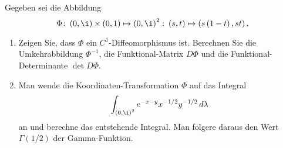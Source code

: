     \begin{prob}[Transformieren]
%
Gegeben sei die Abbildung
$$
\Phi \colon \left( 0 , \i \right) \times \left( 0 , 1 \right) \mapsto \left( 0 , \i \right)^2 \colon \left( s , t \right) \mapsto \left( s \left( 1 - t \right) , s t \right).
$$
\begin{enumerate}[label = (\alph*)]
	\item Zeigen Sie, dass $\Phi$ ein $C^1$-Diffeomorphismus ist. Berechnen Sie die Umkehrabbildung $\Phi^{-1}$, die Funktional-Matrix $D \Phi$ und die Funktional-Determinante $\det D \Phi$.
	\item Man wende die Koordinaten-Transformation $\Phi$ auf das Integral
	$$
	\int_{ \left( 0 , \i \right)^2 } e^{- x - y} x^{-1 / 2} y^{- 1 / 2} \, d \lambda
	$$
	an und berechne das entstehende Integral. Man folgere daraus den Wert $\Gamma(1/2)$ der Gamma-Funktion.
\end{enumerate}
\vspace{2mm}
    \end{prob}

